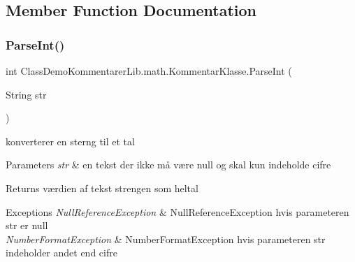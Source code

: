 \subsection{Member Function Documentation}
\mbox{\label{class_class_demo_kommentarer_lib_1_1math_1_1_kommentar_klasse_af0f5b84b9d2d6fb50e9040fdcc5f58fd}} 
\subsubsection{\texorpdfstring{ParseInt()}{ParseInt()}}
{\footnotesize\ttfamily int Class\+Demo\+Kommentarer\+Lib.\+math.\+Kommentar\+Klasse.\+Parse\+Int (\begin{DoxyParamCaption}\item[{String}]{str }\end{DoxyParamCaption})\hspace{0.3cm}{\ttfamily [inline]}}



konverterer en sterng til et tal 


\begin{DoxyParams}{Parameters}
{\em str} & en tekst der ikke må være null og skal kun indeholde cifre\\
\hline
\end{DoxyParams}
\begin{DoxyReturn}{Returns}
værdien af tekst strengen som heltal 
\end{DoxyReturn}

\begin{DoxyExceptions}{Exceptions}
{\em Null\+Reference\+Exception} & Null\+Reference\+Exception hvis parameteren str er null\\
\hline
{\em Number\+Format\+Exception} & Number\+Format\+Exception hvis parameteren str indeholder andet end cifre\\
\hline
\end{DoxyExceptions}
\mbox{\label{class_class_demo_kommentarer_lib_1_1math_1_1_kommentar_klasse_abaeb015e9202262a6566682de68f291e}} 
